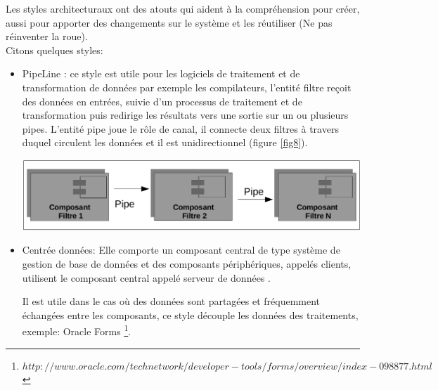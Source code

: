 \documentclass[12pt, a4paper, openany]{report}
\begin{document}
 Les styles architecturaux ont des atouts qui aident à la compréhension pour créer, aussi pour apporter des changements sur le système et les réutiliser (Ne pas réinventer la roue).\\
 
  Citons quelques styles:
  \begin{itemize}
      \item  PipeLine \cite{refbibPipeLine}: ce style est utile pour les logiciels de traitement et de transformation de données par exemple les compilateurs, l'entité filtre reçoit des données en entrées, suivie d'un processus de traitement et de transformation puis redirige les résultats vers une sortie sur un ou plusieurs pipes. L'entité pipe joue le rôle de canal, il connecte deux filtres à travers duquel circulent les données et il est unidirectionnel (figure \ref{fig8}).
 
              \begin{center}
                \includegraphics[scale=0.3]{pipe_line_8.png}
                \label{fig8}
              \end{center}
              
      \item  Centrée données: Elle comporte un composant central de type système de gestion de base de données et des composants périphériques, appelés clients, utilisent le composant central appelé serveur de données \cite{refbibCentreDonnee}.
      
      Il est utile dans le cas où des données sont partagées et fréquemment échangées entre les composants, ce style découple les données des traitements, exemple: Oracle Forms \footnote{$http://www.oracle.com/technetwork/developer-tools/forms/overview/index-098877.html$}.
      

\end{itemize}
\end{document}
